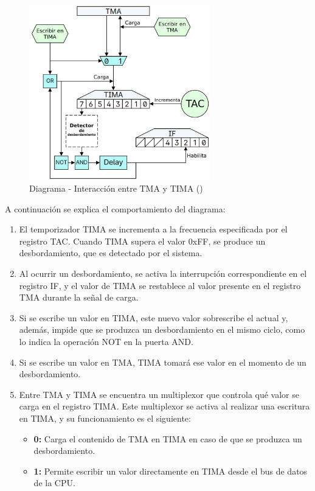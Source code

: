 \begin{figure}[h]
    \centering
    \includegraphics[width=0.7\textwidth]{include/images/tmatactima.jpg}
    \caption{Diagrama - Interacción entre TMA y TIMA (\cite{newpandocs})}
    \label{figure:tmatima}
\end{figure}

A continuación se explica el comportamiento del diagrama:

\begin{enumerate} 
    \item El temporizador TIMA se incrementa a la frecuencia especificada por el registro TAC. Cuando TIMA supera el valor 0xFF, se produce un desbordamiento, que es detectado por el sistema. 
    \item Al ocurrir un desbordamiento, se activa la interrupción correspondiente en el registro IF, y el valor de TIMA se restablece al valor presente en el registro TMA durante la señal de carga. 
    \item Si se escribe un valor en TIMA, este nuevo valor sobrescribe el actual y, además, impide que se produzca un desbordamiento en el mismo ciclo, como lo indica la operación NOT en la puerta AND. 
    \item Si se escribe un valor en TMA, TIMA tomará ese valor en el momento de un desbordamiento. 
    \item Entre TMA y TIMA se encuentra un multiplexor que controla qué valor se carga en el registro TIMA. Este multiplexor se activa al realizar una escritura en TIMA, y su funcionamiento es el siguiente: 
    \begin{itemize} 
        \item \textbf{0:} Carga el contenido de TMA en TIMA en caso de que se produzca un desbordamiento. 
        \item \textbf{1:} Permite escribir un valor directamente en TIMA desde el bus de datos de la CPU. 
    \end{itemize} 
\end{enumerate}

